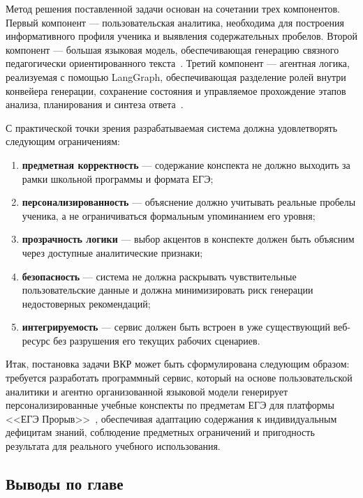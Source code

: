 \documentclass[a4paper,12pt]{extarticle}
\begin{document}
Метод решения поставленной задачи основан на сочетании трех компонентов. Первый компонент --- пользовательская аналитика,
необходима для построения информативного профиля ученика и выявления содержательных 
пробелов. Второй компонент --- большая языковая модель, обеспечивающая 
генерацию связного педагогически ориентированного текста~\cite{kasneci2023chatgpt,shi2025llmedu}. 
Третий компонент --- агентная логика, реализуемая с помощью LangGraph, обеспечивающая разделение ролей 
внутри конвейера генерации, сохранение состояния и управляемое прохождение этапов анализа, планирования и 
синтеза ответа~\cite{langchain2024}.

С практической точки зрения разрабатываемая система должна удовлетворять следующим ограничениям:

\begin{enumerate}
    \item \textbf{предметная корректность} --- содержание конспекта не должно выходить за рамки школьной программы 
	и формата ЕГЭ;
    \item \textbf{персонализированность} --- объяснение должно учитывать реальные пробелы ученика, а не 
	ограничиваться формальным упоминанием его уровня;
    \item \textbf{прозрачность логики} --- выбор акцентов в конспекте должен быть объясним через доступные 
	аналитические признаки;
    \item \textbf{безопасность} --- система не должна раскрывать чувствительные пользовательские данные и должна
	 минимизировать риск генерации недостоверных рекомендаций;
    \item \textbf{интегрируемость} --- сервис должен быть встроен в уже существующий веб-ресурс без разрушения его 
	текущих рабочих сценариев.
\end{enumerate}

Итак, постановка задачи ВКР может быть сформулирована следующим образом: требуется разработать программный сервис, 
который на основе пользовательской аналитики и агентно организованной языковой модели генерирует персонализированные 
учебные конспекты по предметам ЕГЭ для платформы <<ЕГЭ Прорыв>>~\cite{exambreakout2026}, обеспечивая адаптацию 
содержания к индивидуальным дефицитам знаний, соблюдение предметных ограничений и 
пригодность результата для реального учебного использования.

\subsection{Выводы по главе}
\end{document}
